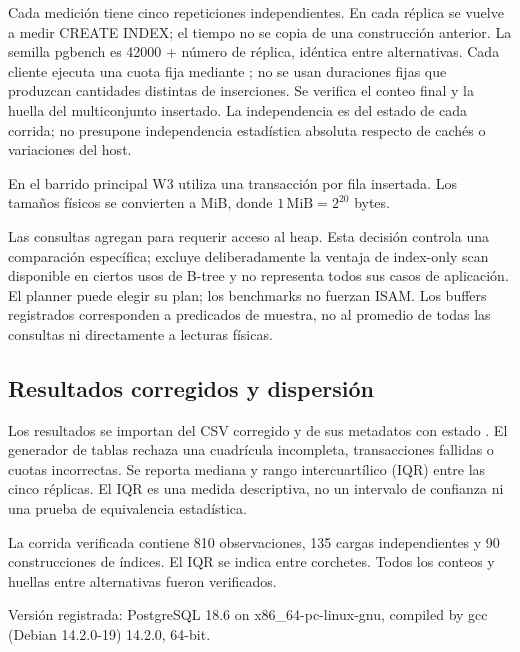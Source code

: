 \documentclass[11pt,a4paper]{article}
\newcommand{\code}[1]{\texttt{\detokenize{#1}}}
\begin{document}
Cada medición tiene cinco repeticiones independientes. En cada réplica se vuelve
a medir CREATE INDEX; el tiempo no se copia de una construcción anterior. La
semilla pgbench es 42000 + número de réplica, idéntica entre alternativas. Cada
cliente ejecuta una cuota fija mediante \code{-t}; no se usan duraciones fijas
que produzcan cantidades distintas de inserciones. Se verifica el conteo final
y la huella del multiconjunto insertado. La independencia es del estado de cada
corrida; no presupone independencia estadística absoluta respecto de cachés o
variaciones del host.

En el barrido principal W3 utiliza una transacción por fila insertada. Los
tamaños físicos se convierten a MiB, donde $1\,\mathrm{MiB}=2^{20}$ bytes.

Las consultas agregan \code{payload} para requerir acceso al heap. Esta decisión
controla una comparación específica; excluye deliberadamente la ventaja de
index-only scan disponible en ciertos usos de B-tree y no representa todos sus
casos de aplicación. El planner puede elegir su plan; los benchmarks no fuerzan
ISAM. Los buffers registrados corresponden a predicados de muestra, no al
promedio de todas las consultas ni directamente a lecturas físicas.

\subsection{Resultados corregidos y dispersión}
Los resultados se importan del CSV corregido y de sus metadatos con estado
\code{completed}. El generador de tablas rechaza una cuadrícula incompleta,
transacciones fallidas o cuotas incorrectas. Se reporta mediana y rango
intercuartílico (IQR) entre las cinco réplicas. El IQR es una medida descriptiva,
no un intervalo de confianza ni una prueba de equivalencia estadística.

La corrida verificada contiene 810 observaciones, 135 cargas independientes y 90 construcciones de índices. El IQR se indica entre corchetes. Todos los conteos y huellas entre alternativas fueron verificados.

Versión registrada: PostgreSQL 18.6 on x86\_64-pc-linux-gnu, compiled by gcc (Debian 14.2.0-19) 14.2.0, 64-bit.\par
\end{document}
